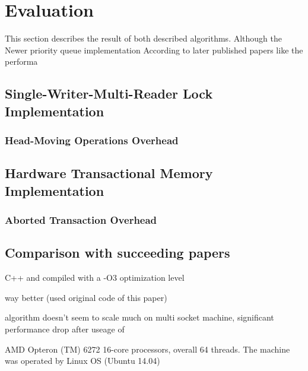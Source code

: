 
\section{Evaluation}

This section describes the result of both described algorithms. Although the   Newer priority queue implementation According to later published papers like \cite{braginsky_cbpq:_2016, } the performa



\subsection{Single-Writer-Multi-Reader Lock Implementation}

\subsubsection{Head-Moving Operations Overhead}

\subsection{Hardware Transactional Memory Implementation}

\subsubsection{Aborted Transaction Overhead}

\subsection{Comparison with succeeding papers}

C++ and compiled with a -O3 optimization level

\cite{braginsky_cbpq:_2016, } way better (used original code of this paper)

algorithm doesn't seem to scale much on multi socket machine, significant performance drop after useage of

AMD Opteron (TM) 6272
16-core processors, overall 64 threads. The machine was operated by Linux OS
(Ubuntu 14.04)

\cite{rihani_multiqueues:_2014}

\cite{wimmer_lock-free_2015}

\cite{alistarh_spraylist:_2015}